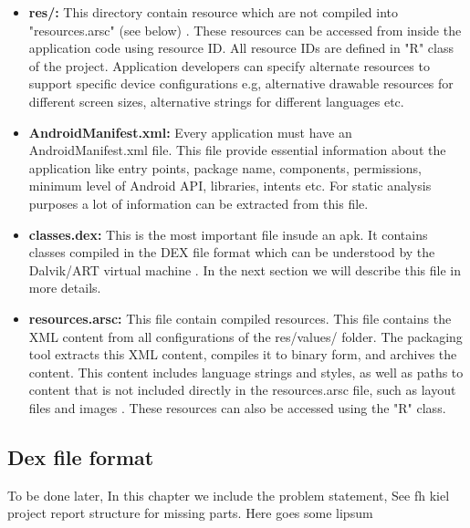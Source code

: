 \documentclass{article}
\begin{document}
\begin{itemize}
					\item \textbf{res/:} This directory contain resource which are not compiled into "resources.arsc" (see below) \cite{APK_structure}. These resources can be accessed from inside the application code using resource ID. All resource IDs are defined in "R" class of the project. Application developers can specify alternate resources to support specific device configurations e.g, alternative drawable resources for different screen sizes, alternative strings for different languages etc.

					\item \textbf{AndroidManifest.xml:} Every application must have an AndroidManifest.xml file. This file provide essential information about the application like entry points, package name, components, permissions, minimum level of Android API, libraries, intents etc. For static analysis purposes a lot of information can be extracted from this file.

					\item \textbf{classes.dex:} This is the most important file insude an apk. It contains classes compiled in the DEX file format which can be understood by the Dalvik/ART virtual machine \cite{APK_structure}. In the next section we will describe this file in more details.

					\item \textbf{resources.arsc:} This file contain compiled resources. This file contains the XML content from all configurations of the res/values/ folder. The packaging tool extracts this XML content, compiles it to binary form, and archives the content. This content includes language strings and styles, as well as paths to content that is not included directly in the resources.arsc file, such as layout files and images \cite{APK_structure}. These resources can also be accessed using the "R" class.
				\end{itemize}
		\subsection{Dex file format}\label{sec:dex}				
				\lipsum[1]
				
				
		\lipsum[1]
		To be done later, In this chapter we include the problem statement, See fh kiel project report structure for missing parts. Here goes some lipsum
		\lipsum[1]
		
\end{document}
